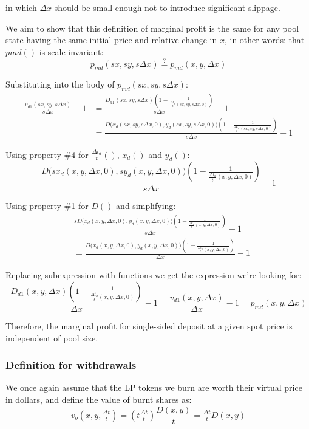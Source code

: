 \documentclass{article}
\begin{document}
in which $\Delta{x}$ should be small enough not to introduce significant slippage.

We aim to show that this definition of marginal profit is the same for any pool state having the same initial price and relative change in $x$, in other words: that $pmd()$ is scale invariant:
\[
p_{md}(sx, sy, s\Delta{x}) \stackrel{?}{=} p_{md}(x, y, \Delta{x})
\]

Substituting into the body of $p_{md}(sx, sy, s\Delta{x})$:
\[
\begin{split}
  \frac{v_{d1}(sx, sy, s\Delta{x})}{s\Delta{x}} - 1 &= \frac{D_{d1}(sx, sy, s\Delta{x}) \left(1 - \frac{1}{\tfrac{\Delta{t}_d}{t}(sx, sy, s\Delta{x}, 0)}\right)}{s\Delta{x}} - 1 \\
  &= \frac{D\bigl(x_d(sx, sy, s\Delta{x}, 0), y_d(sx, sy, s\Delta{x}, 0)\bigr) \left(1 - \frac{1}{\tfrac{\Delta{t}_d}{t}(sx, sy, s\Delta{x}, 0)}\right)}{s\Delta{x}} - 1
\end{split}
\]

Using property \#4 for $\tfrac{\Delta{t}_d}{t}()$, $x_d()$ and $y_d()$:
\[
\frac{D\bigl(sx_d(x, y, \Delta{x}, 0), sy_d(x, y, \Delta{x}, 0)\bigr) \left(1 - \frac{1}{\tfrac{\Delta{t}_d}{t}(x, y, \Delta{x}, 0)}\right)}{s\Delta{x}} - 1
\]

Using property \#1 for $D()$ and simplifying:
\[
\begin{split}
  &\frac{sD\bigl(x_d(x, y, \Delta{x}, 0), y_d(x, y, \Delta{x}, 0)\bigr) \left(1 - \frac{1}{\tfrac{\Delta{t}_d}{t}(x, y, \Delta{x}, 0)}\right)}{s\Delta{x}} - 1 \\
  &= \frac{D\bigl(x_d(x, y, \Delta{x}, 0), y_d(x, y, \Delta{x}, 0)\bigr) \left(1 - \frac{1}{\tfrac{\Delta{t}_d}{t}(x, y, \Delta{x}, 0)}\right)}{\Delta{x}} - 1
\end{split}
\]

Replacing subexpression with functions we get the expression we're looking for:
\[
\frac{D_{d1}(x, y, \Delta{x}) \left(1 - \frac{1}{\tfrac{\Delta{t}_d}{t}(x, y, \Delta{x}, 0)}\right)}{\Delta{x}} - 1 = \frac{v_{d1}(x, y, \Delta{x})}{\Delta{x}} - 1 = p_{md}(x, y, \Delta{x})
\]

Therefore, the marginal profit for single-sided deposit at a given spot price is independent of pool size.

\subsubsection{Definition for withdrawals}

We once again assume that the LP tokens we burn are worth their virtual price in dollars, and define the value of burnt shares as:
\[
v_b(x, y, \tfrac{\Delta{t}}{t}) = \left(t \tfrac{\Delta{t}}{t}\right) \frac{D(x, y)}{t} = \tfrac{\Delta{t}}{t} D(x, y)
\]
\end{document}
